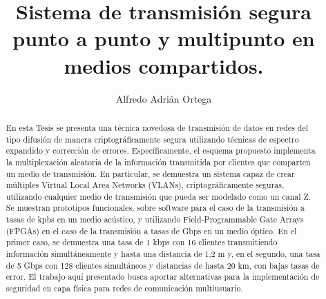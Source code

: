 \documentclass[12pt,twoside,openright]{moddalthesis}
\begin{document}
\title{\textbf{Sistema de transmisión segura punto a punto y multipunto en medios compartidos.}}
\author{Alfredo Adrián Ortega}
\address{Buenos Aires, Argentina}


{}








\nodedicationpage
\nolistoftables
\nolistoffigures


\beforepreface
 
\begin{abstract}
En esta Tesis se presenta una técnica novedosa de transmisión de datos en redes del tipo difusión de manera criptográficamente segura utilizando técnicas de espectro expandido y corrección de errores. Específicamente, el esquema propuesto implementa la multiplexación aleatoria de la información transmitida por clientes que comparten un medio de transmisión. En particular, se demuestra un sistema capaz de crear múltiples Virtual Local Area Networks (VLANs), criptográficamente seguras, utilizando cualquier medio de transmisión que pueda ser modelado como un canal Z. Se muestran prototipos funcionales, sobre software para el caso de la transmisión a tasas de kpbs en un medio acústico, y utilizando  Field-Programmable Gate Arrays (FPGAs) en el caso de la transmisión a tasas de Gbps en un medio óptico. En el primer caso, se demuestra una tasa de 1 kbps con 16 clientes transmitiendo información simultáneamente y hasta una distancia de 1,2 m y, en el segundo, una tasa de 5 Gbps con 128 clientes simultáneos y distancias de hasta 20 km, con bajas tasas de error. El trabajo aquí presentado busca aportar alternativas para la implementación de  seguridad en capa física para redes de comunicación multiusuario.
\end{abstract}
\end{document}
